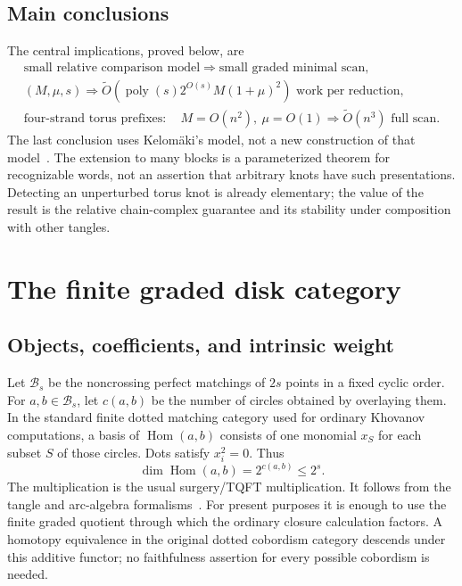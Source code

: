 \documentclass[11pt,letterpaper]{article}
\theoremstyle{remark}\newtheorem{remark}[theorem]{Remark}
\newcommand{\Hom}{\operatorname{Hom}}
\newcommand{\poly}{\operatorname{poly}}
\begin{document}
\subsection{Main conclusions}
The central implications, proved below, are
\begin{equation}\label{eq:roadmap}
\begin{gathered}
 \text{small relative comparison model}
 \Longrightarrow \text{small graded minimal scan},\\
 (M,\mu,s)\Longrightarrow
 \widetilde O\!\left(\poly(s)2^{O(s)}M(1+\mu)^2\right)
 \text{ work per reduction},\\
 \text{four-strand torus prefixes}:\quad M=O(n^2),\ \mu=O(1)
 \Longrightarrow \widetilde O(n^3)\text{ full scan}.
\end{gathered}
\end{equation}
The last conclusion uses Kelom\"aki's model, not a new construction of that model~\cite{Kel25}. The extension to many blocks is a parameterized theorem for recognizable words, not an assertion that arbitrary knots have such presentations. Detecting an unperturbed torus knot is already elementary; the value of the result is the relative chain-complex guarantee and its stability under composition with other tangles.

\section{The finite graded disk category}
\subsection{Objects, coefficients, and intrinsic weight}
Let $\mathcal B_s$ be the noncrossing perfect matchings of $2s$ points in a fixed cyclic order. For $a,b\in\mathcal B_s$, let $c(a,b)$ be the number of circles obtained by overlaying them. In the standard finite dotted matching category used for ordinary Khovanov computations, a basis of $\Hom(a,b)$ consists of one monomial $x_S$ for each subset $S$ of those circles. Dots satisfy $x_i^2=0$. Thus
\[
 \dim\Hom(a,b)=2^{c(a,b)}\le 2^s.
\]
The multiplication is the usual surgery/TQFT multiplication. It follows from the tangle and arc-algebra formalisms~\cite{BN05,Kho02}. For present purposes it is enough to use the finite graded quotient through which the ordinary closure calculation factors. A homotopy equivalence in the original dotted cobordism category descends under this additive functor; no faithfulness assertion for every possible cobordism is needed.
\end{document}

